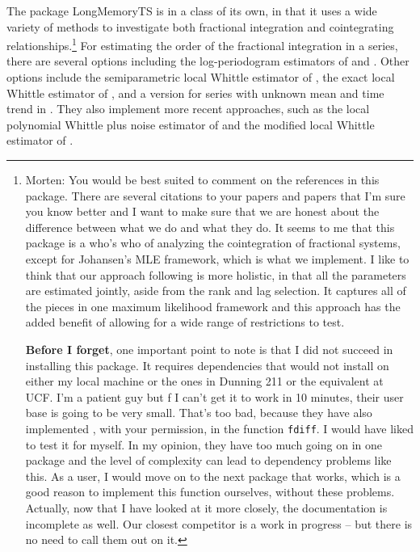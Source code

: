 \documentclass[11pt,letterpaper]{paper}
\newcommand{\pkg}[1]{{\normalfont\fontseries{b}\selectfont #1}}
\let\fct=\texttt
\begin{document}
The package \pkg{LongMemoryTS} is in a class of its own, in that it uses a wide variety of methods to investigate both fractional integration and cointegrating relationships.\footnote{Morten: You would be best suited to comment on the references in this package. 
There are several citations to your papers and papers that I'm sure you know better and I want to make sure that we are honest about the difference between what we do and what they do. 
It seems to me that this package is a who's who of analyzing the cointegration of fractional systems, except for Johansen's MLE framework, which is what we implement.
I like to think that our approach following \citet{Johansen1995} is more holistic, in that all the parameters are estimated jointly, aside from the rank and lag selection. 
It captures all of the pieces in one maximum likelihood framework and this approach has the added benefit of allowing for a wide range of restrictions to test. 

\textbf{Before I forget}, one important point to note is that I did not succeed in installing this package. 
It requires dependencies that would not install on either my local machine or the ones in Dunning 211 or the equivalent at UCF. 
I'm a patient guy but f I can't get it to work in 10 minutes, their user base is going to be very small. 
That's too bad, because they have also implemented \cite{Jensen2014}, with your permission, in the function \fct{fdiff}. I would have liked to test it for myself. 
In my opinion, they have too much going on in one package and the level of complexity can lead to dependency problems like this. 
As a user, I would move on to the next package that works, which is a good reason to implement this function ourselves, without these problems. 
Actually, now that I have looked at it more closely, the documentation is incomplete as well. 
Our closest competitor is a work in progress -- but there is no need to call them out on it. } 
% 
For estimating the order of the fractional integration in a series, there are several options including the log-periodogram estimators of \citet{GPH1983} and \citet{RobinsonPM1995b}. 
% 
Other options include the semiparametric local Whittle estimator of \citet{RobinsonPM1995a},
the exact local Whittle estimator of \citet{ShimotsuPhillips2005}, 
and a version for series with unknown mean and time trend in \citet{Shimotsu2010}. 
They also implement more recent approaches, such as 
the local polynomial Whittle plus noise estimator of \citet{FredNielsenNielsen2012} 
and the modified local Whittle estimator of \citet{HouPerron2014}. 
\end{document}
